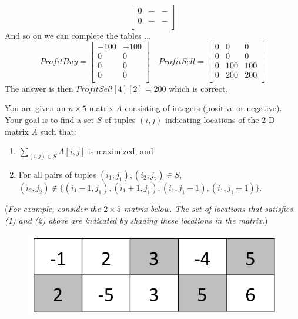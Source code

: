 \documentclass[answers]{exam}
\begin{document}
\begin{questions}
\begin{solution}
\[\begin{bmatrix}
    0 & - & -\\
    0 & - & - \\
    \end{bmatrix}
\]
And so on we can complete the tables ...
\[
    ProfitBuy =
    \begin{bmatrix}
    -100 & -100 \\
    0 & 0 \\
    0 & 0 \\
    0 & 0 \\
    \end{bmatrix} \quad
    ProfitSell =
    \begin{bmatrix}
    0 & 0 & 0 \\
    0 & 0 & 0 \\
    0 & 100 & 100\\
    0 & 200 & 200 \\
    \end{bmatrix}
\]
The answer is then $ProfitSell[4][2] = 200$ which is correct.

\end{solution}






\question[20] You are given an $n \times 5$ matrix $A$ consisting of integers (positive or negative). 
Your goal is to find a set $S$ of tuples $(i, j)$ indicating locations of the 2-D matrix $A$ such that:
\begin{enumerate}
\item $\sum_{(i, j) \in S} A[i, j]$ is maximized, and
\item For all pairs of tuples $(i_1, j_1), (i_2, j_2) \in S$, $(i_2, j_2) \notin \{(i_1-1, j_1), (i_1+1, j_1), (i_1, j_1-1), (i_1, j_1+1)\}$.
\end{enumerate}

({\it For example, consider the $2 \times 5$ matrix below. The set of locations that satisfies (1) and (2) above are indicated by shading these locations in the matrix.})

\begin{figure}[h]
\centering
\includegraphics[scale=0.2]{array}
\end{figure}


\end{questions}
\end{document}
